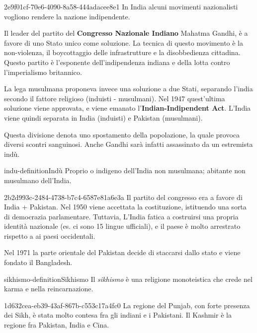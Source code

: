 \documentclass[preview]{standalone}
\begin{document}
\begin{snippet}{2e9f01cf-70e6-4090-8a58-444adacee8e1}
    In India alcuni movimenti nazionalisti vogliono
    rendere la nazione indipendente. 
    
    Il leader del partito del \textbf{Congresso Nazionale Indiano} Mahatma Gandhi,
    è a favore di uno Stato unico come soluzione.
    La tecnica di questo movimento è la non-violenza, il boycottaggio
    delle infrastrutture e la disobbedienza cittadina.
    Questo partito è l'esponente dell'indipendenza indiana e della lotta contro l'imperialismo britannico.
    
    La lega musulmana proponeva invece una soluzione a due Stati,
    separando l'india secondo il fattore religioso (induisti - musulmani).
    Nel 1947 quest'ultima soluzione viene approvata, e viene emanato
    l'\textbf{Indian-Indipendent Act}. 
    L'India viene quindi separata in India (induisti) e Pakistan (musulmani).
    
    Questa divisione denota uno spostamento della popolazione,
    la quale provoca diversi scontri sanguinosi.
    Anche Gandhi sarà infatti assassinato da un estremista indù.
\end{snippet}

\begin{snippetdefinition}{indu-definition}{Indù}
    Proprio o indigeno dell'India non musulmana; abitante non musulmano dell'India.
\end{snippetdefinition}

\begin{snippet}{2b2d993c-2484-4738-b7c4-6587e81a6e3a}
    Il partito del congresso era a favore di India + Pakistan. 
    Nel 1950 viene accettata la costituzione, istituendo una sorta di democrazia parlamentare.
    Tuttavia, L'India fatica a costruirsi una propria identità nazionale (es. ci sono 15 lingue ufficiali),
    e il paese è molto arrestrato rispetto a ai paesi occidentali.

    Nel 1971 la parte orientale del Pakistan decide di staccarsi dallo stato e viene fondato
    il Bangladesh.
\end{snippet}

\begin{snippetdefinition}{sikhismo-definition}{Sikhismo}
    Il \textit{sikhismo} è una religione monoteistica che crede nel karma e nella reincarnazione.
\end{snippetdefinition}

\begin{snippet}{1d632cea-eb39-43af-867b-c553c17a4fc0}
    La regione del Punjab, con forte presenza dei Sikh, è stata molto contesa fra gli
    indiani e i Pakistani.
    Il Kashmir è la regione fra Pakistan, India e Cina.
\end{snippet}
\end{document}
